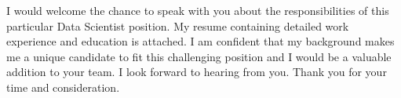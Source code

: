 \documentclass[12pt,letterpaper]{moderncv}   %
\newcommand{\JobPositionName}{Data Scientist}
\begin{document}

I would welcome the chance to speak with you about the responsibilities of this particular \JobPositionName{} position. My resume containing detailed work experience and education is attached. I am confident that my background makes me a unique candidate to fit this challenging position and I would be a valuable addition to your team. I look forward to hearing from you.
Thank you for your time and consideration.

\vspace{0.5cm}

\makeletterclosing
\end{document}

